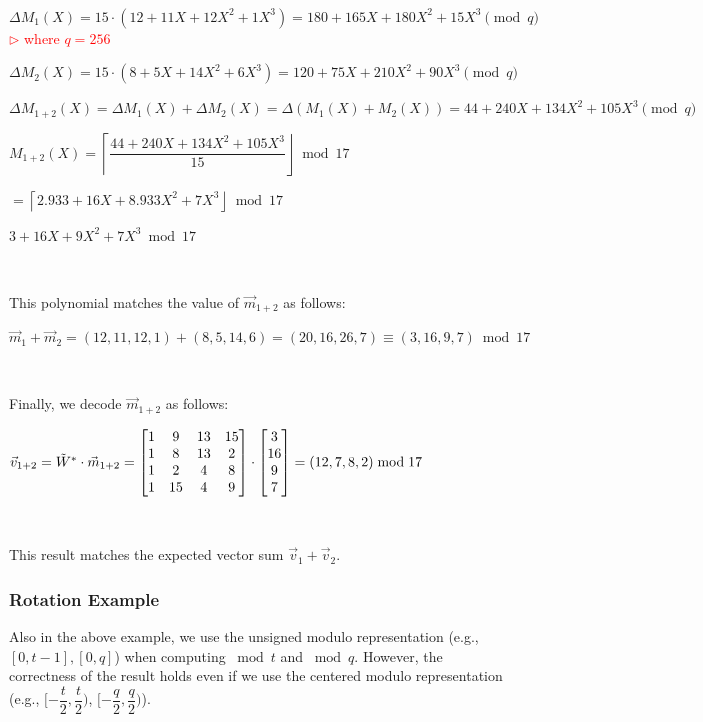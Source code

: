 $ $

$\Delta M_1(X) = 15\cdot(12 + 11X + 12X^2 + 1X^3) = 180 + 165X + 180X^2 + 15X^3 \pmod{q}$ \textcolor{red}{  $\rhd$ where $q = 256$}

$\Delta M_2(X) = 15\cdot(8 + 5X + 14X^2 + 6X^3) = 120 + 75X + 210X^2 + 90X^3 \pmod{q}$

$\Delta M_{1+2}(X) = \Delta M_1(X) + \Delta M_2(X) = \Delta (M_1(X) + M_2(X)) = 44 + 240X + 134X^2 + 105X^3 \pmod{q}$

$M_{1+2}(X) =\left\lceil\dfrac{44 + 240X + 134X^2 + 105X^3}{15}\right\rfloor \bmod 17$

$= \left\lceil2.933 + 16X + 8.933X^2 + 7X^3\right\rfloor \bmod 17$

$3 + 16X + 9X^2 + 7X^3 \bmod 17 $

$ $


This polynomial matches the value of $\vec{m}_{1+2}$ as follows:

$\vec{m}_1 + \vec{m}_2 = (12, 11, 12, 1) + (8, 5, 14, 6) = (20, 16, 26, 7) \equiv (3, 16, 9, 7) \bmod 17$

$ $

Finally, we decode $\vec{m}_{1+2}$ as follows:



$\vec{v}_{1+2} = \tilde{W}^* \cdot \vec{m}_{1+2} = \begin{bmatrix}
1 & 9 & 13 & 15\\
1 & 8 & 13 & 2\\
1 & 2 & 4 & 8\\
1 & 15 & 4 & 9\\
\end{bmatrix} \cdot \begin{bmatrix}3\\16\\9\\7\end{bmatrix} = (12, 7, 8, 2) \bmod{17}$

$ $

This result matches the expected vector sum $\vec{v}_1 + \vec{v}_2$.




\subsubsection{Rotation Example}
\label{subsubsec:bfv-rotation-ex}

Also in the above example, we use the unsigned modulo representation (e.g., $[0, t-1], [0, q]$) when computing $\bmod t$ and $\bmod q$. However, the correctness of the result holds even if we use the centered modulo representation (e.g., $[-\dfrac{t}{2}, \dfrac{t}{2})$, $[-\dfrac{q}{2}, \dfrac{q}{2})$).

